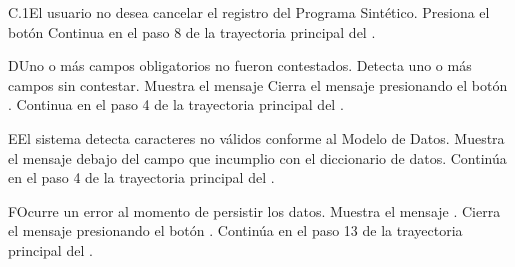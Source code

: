 \begin{UCtrayectoriaA}{C.1}{El usuario no desea cancelar el registro del Programa Sintético.}
\UCpaso[\UCactor] Presiona el botón 
\UCpaso Continua en el paso 8 de la trayectoria principal del .
\end{UCtrayectoriaA}

\begin{UCtrayectoriaA}{D}{Uno o más campos obligatorios no fueron contestados.}
\UCpaso Detecta uno o más campos sin contestar.
\UCpaso Muestra el mensaje 
\UCpaso[\UCactor] Cierra el mensaje presionando el botón .
\UCpaso Continua en el paso 4 de la trayectoria principal del .
\end{UCtrayectoriaA}

\begin{UCtrayectoriaA}{E}{El sistema detecta caracteres no válidos conforme al Modelo de Datos.}
	\UCpaso Muestra el mensaje  debajo del campo que incumplio con el diccionario de datos.
	\UCpaso Continúa en el paso 4 de la trayectoria principal del .
\end{UCtrayectoriaA}

\begin{UCtrayectoriaA}{F}{Ocurre un error al momento de persistir los datos.}
	\UCpaso Muestra el mensaje .
	\UCpaso[\UCactor] Cierra el mensaje presionando el botón .
	\UCpaso Continúa en el paso 13 de la trayectoria principal del .
\end{UCtrayectoriaA}
